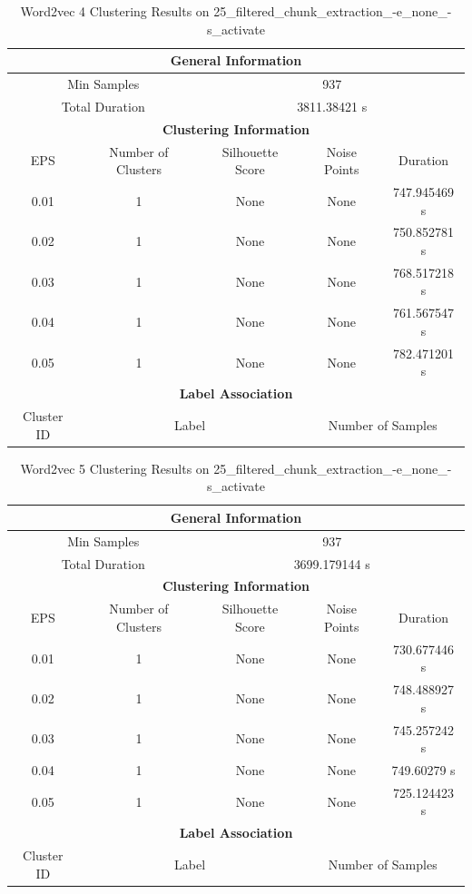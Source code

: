 \begin{longtable}{|c|c|c|c|c|}
\caption{Word2vec 4 Clustering Results on 25\_filtered\_chunk\_extraction\_-e\_none\_-s\_activate} \label{tab:25_filtered_chunk_extraction_-e_none_-s_activate_word2vec_4_clustering_results}\\
\hline
\multicolumn{5}{|c|}{\textbf{General Information}} \\
\hline
\multicolumn{2}{|c|}{Min Samples} & \multicolumn{3}{c|}{937} \\
\multicolumn{2}{|c|}{Total Duration} & \multicolumn{3}{c|}{3811.38421 s} \\
\hline
\multicolumn{5}{|c|}{\textbf{Clustering Information}} \\
\hline
EPS & Number of Clusters & Silhouette Score & Noise Points & Duration \\
0.01 & 1 & None & None & 747.945469 s\\
0.02 & 1 & None & None & 750.852781 s\\
0.03 & 1 & None & None & 768.517218 s\\
0.04 & 1 & None & None & 761.567547 s\\
0.05 & 1 & None & None & 782.471201 s\\
\hline
\multicolumn{5}{|c|}{\textbf{Label Association}} \\
\hline
Cluster ID & \multicolumn{2}{c|}{Label} & \multicolumn{2}{c|}{Number of Samples} \\
\hline
\end{longtable}


\begin{longtable}{|c|c|c|c|c|}
\caption{Word2vec 5 Clustering Results on 25\_filtered\_chunk\_extraction\_-e\_none\_-s\_activate} \label{tab:25_filtered_chunk_extraction_-e_none_-s_activate_word2vec_5_clustering_results}\\
\hline
\multicolumn{5}{|c|}{\textbf{General Information}} \\
\hline
\multicolumn{2}{|c|}{Min Samples} & \multicolumn{3}{c|}{937} \\
\multicolumn{2}{|c|}{Total Duration} & \multicolumn{3}{c|}{3699.179144 s} \\
\hline
\multicolumn{5}{|c|}{\textbf{Clustering Information}} \\
\hline
EPS & Number of Clusters & Silhouette Score & Noise Points & Duration \\
0.01 & 1 & None & None & 730.677446 s\\
0.02 & 1 & None & None & 748.488927 s\\
0.03 & 1 & None & None & 745.257242 s\\
0.04 & 1 & None & None & 749.60279 s\\
0.05 & 1 & None & None & 725.124423 s\\
\hline
\multicolumn{5}{|c|}{\textbf{Label Association}} \\
\hline
Cluster ID & \multicolumn{2}{c|}{Label} & \multicolumn{2}{c|}{Number of Samples} \\
\hline
\end{longtable}


